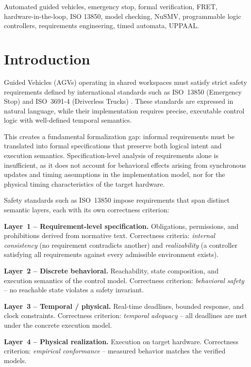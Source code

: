 \documentclass{ieeeaccess}
\theoremstyle{definition}
\begin{document}
\begin{keywords}
Automated guided vehicles, emergency stop, formal verification, FRET, hardware-in-the-loop, ISO 13850, model checking, NuSMV, programmable logic controllers, requirements engineering, timed automata, UPPAAL.
\end{keywords}

\titlepgskip=-21pt

\maketitle

\section{Introduction}
\label{sec:introduction}
 Guided Vehicles (AGVs) operating in shared workspaces must satisfy strict safety requirements defined by international standards such as ISO~13850 (Emergency Stop) \cite{ISO13850} and ISO~3691-4 (Driverless Trucks) \cite{ISO3691-4}. These standards are expressed in natural language, while their implementation requires precise, executable control logic with well-defined temporal semantics.

This creates a fundamental formalization gap: informal requirements must be translated into formal specifications that preserve both logical intent and execution semantics. Specification-level analysis of requirements alone is insufficient, as it does not account for behavioral effects arising from synchronous updates and timing assumptions in the implementation model, nor for the physical timing characteristics of the target hardware.

Safety standards such as ISO~13850 impose requirements that span distinct semantic layers, each with its own correctness criterion:
\begin{description}
  \item \textbf{Layer~1 -- Requirement-level specification.} Obligations, permissions, and prohibitions derived from normative text. Correctness criteria: \emph{internal consistency} (no requirement contradicts another) and \emph{realizability} (a controller satisfying all requirements against every admissible environment exists).
  \item \textbf{Layer~2 -- Discrete behavioral.} Reachability, state composition, and execution semantics of the control model. Correctness criterion: \emph{behavioral safety} -- no reachable state violates a safety invariant.
  \item \textbf{Layer~3 -- Temporal / physical.} Real-time deadlines, bounded response, and clock constraints. Correctness criterion: \emph{temporal adequacy} -- all deadlines are met under the concrete execution model.
  \item \textbf{Layer~4 -- Physical realization.} Execution on target hardware. Correctness criterion: \emph{empirical conformance} -- measured behavior matches the verified models.
\end{description}
\end{document}
